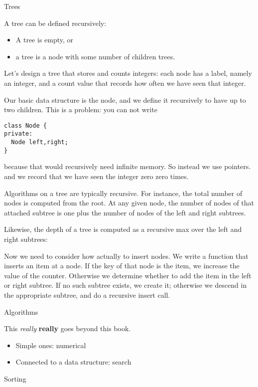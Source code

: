  {Trees}

\prerequisite{\ref{ch:pointer}}

A tree can be defined recursively:
\begin{itemize}
\item A tree is empty, or
\item a tree is a node with some number of children trees.
\end{itemize}
Let's design a tree that stores and counts integers: each node has a
label, namely an integer, and a count value that records how often we
have seen that integer.

Our basic data structure is the node, and we define it recursively to
have up to two children. This is a problem: you can not write
\begin{verbatim}
class Node {
private:
  Node left,right;
}
\end{verbatim}
because that would recursively need infinite memory. So instead we use pointers.
%
%
and we record that we have seen the integer zero zero times.

Algorithms on a tree are typically recursive. For instance, the total
number of nodes is computed from the root. At any given node, the
number of nodes of that attached subtree is one plus the number of
nodes of the left and right subtrees.
%

Likewise, the depth of a tree is computed as a recursive max over the
left and right subtrees:
%

Now we need to consider how actually to insert nodes. We write a
function that inserts an item at a node. If the key of that node is
the item, we increase the value of the counter. Otherwise we determine
whether to add the item in the left or right subtree. If no such
subtree exists, we create it; otherwise we descend in the appropriate
subtree, and do a recursive insert call.
%

 {Algorithms}

This \emph{really} \textbf{really} goes beyond this book.

\begin{itemize}
\item Simple ones: numerical
\item Connected to a data structure: search
\end{itemize}

 {Sorting}

